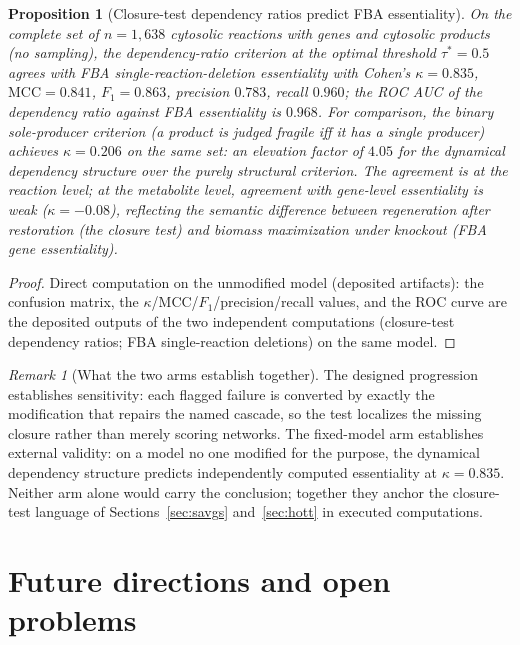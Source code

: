 \documentclass[11pt,a4paper]{article}
\theoremstyle{plain}
\newtheorem{proposition}[theorem]{Proposition}
\theoremstyle{definition}
\theoremstyle{remark}
\newtheorem{remark}[theorem]{Remark}
\begin{document}
\begin{proposition}[Closure-test dependency ratios predict FBA
essentiality]\label{prop:iJO1366-external}
On the complete set of $n=1{,}638$ cytosolic reactions with genes
and cytosolic products (no sampling), the dependency-ratio
criterion at the optimal threshold $\tau^{*}=0.5$ agrees with FBA
single-reaction-deletion essentiality with Cohen's
$\kappa=0.835$, $\mathrm{MCC}=0.841$, $F_1=0.863$, precision
$0.783$, recall $0.960$; the ROC AUC of the dependency ratio
against FBA essentiality is $0.968$. For comparison, the binary
sole-producer criterion (a product is judged fragile iff it has a
single producer) achieves $\kappa=0.206$ on the same set: an
elevation factor of $4.05$ for the dynamical dependency
structure over the purely structural criterion. The agreement is
at the reaction level; at the metabolite level, agreement with
gene-level essentiality is weak ($\kappa=-0.08$), reflecting the
semantic difference between regeneration after restoration
(the closure test) and biomass maximization under knockout (FBA
gene essentiality).
\end{proposition}

\begin{proof}
Direct computation on the unmodified model (deposited artifacts):
the confusion matrix, the $\kappa$/MCC/$F_1$/precision/recall
values, and the ROC curve are the deposited outputs of the two
independent computations (closure-test dependency ratios; FBA
single-reaction deletions) on the same model.
\end{proof}

\begin{remark}[What the two arms establish together]
\label{rem:network-battery-reading}
The designed progression establishes sensitivity: each flagged
failure is converted by exactly the modification that repairs the
named cascade, so the test localizes the missing closure rather
than merely scoring networks. The fixed-model arm establishes
external validity: on a model no one modified for the purpose, the
dynamical dependency structure predicts independently computed
essentiality at $\kappa=0.835$. Neither arm alone would carry the
conclusion; together they anchor the closure-test language of
Sections~\ref{sec:savgs} and~\ref{sec:hott} in executed
computations.
\end{remark}


\section{Future directions and open problems}\label{sec:future}
\end{document}
